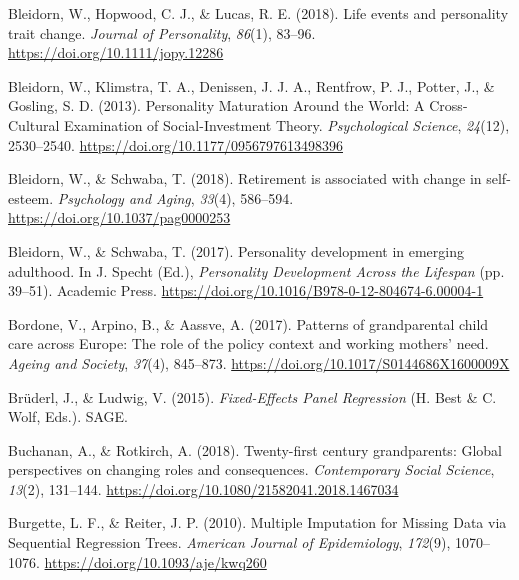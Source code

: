 \documentclass[
  english,
  man, noextraspace]{apa7}
\begin{document}
\leavevmode\hypertarget{ref-bleidornLifeEventsPersonality2018}{}%
Bleidorn, W., Hopwood, C. J., \& Lucas, R. E. (2018). Life events and personality trait change. \emph{Journal of Personality}, \emph{86}(1), 83--96. \url{https://doi.org/10.1111/jopy.12286}

\leavevmode\hypertarget{ref-bleidornPersonalityMaturationWorld2013}{}%
Bleidorn, W., Klimstra, T. A., Denissen, J. J. A., Rentfrow, P. J., Potter, J., \& Gosling, S. D. (2013). Personality Maturation Around the World: A Cross-Cultural Examination of Social-Investment Theory. \emph{Psychological Science}, \emph{24}(12), 2530--2540. \url{https://doi.org/10.1177/0956797613498396}

\leavevmode\hypertarget{ref-bleidornRetirementAssociatedChange2018}{}%
Bleidorn, W., \& Schwaba, T. (2018). Retirement is associated with change in self-esteem. \emph{Psychology and Aging}, \emph{33}(4), 586--594. \url{https://doi.org/10.1037/pag0000253}

\leavevmode\hypertarget{ref-bleidornPersonalityDevelopmentEmerging2017}{}%
Bleidorn, W., \& Schwaba, T. (2017). Personality development in emerging adulthood. In J. Specht (Ed.), \emph{Personality Development Across the Lifespan} (pp. 39--51). Academic Press. \url{https://doi.org/10.1016/B978-0-12-804674-6.00004-1}

\leavevmode\hypertarget{ref-bordonePatternsGrandparentalChild2017}{}%
Bordone, V., Arpino, B., \& Aassve, A. (2017). Patterns of grandparental child care across Europe: The role of the policy context and working mothers' need. \emph{Ageing and Society}, \emph{37}(4), 845--873. \url{https://doi.org/10.1017/S0144686X1600009X}

\leavevmode\hypertarget{ref-bruderlFixedEffectsPanelRegression2015}{}%
Brüderl, J., \& Ludwig, V. (2015). \emph{Fixed-Effects Panel Regression} (H. Best \& C. Wolf, Eds.). SAGE.

\leavevmode\hypertarget{ref-buchananTwentyfirstCenturyGrandparents2018}{}%
Buchanan, A., \& Rotkirch, A. (2018). Twenty-first century grandparents: Global perspectives on changing roles and consequences. \emph{Contemporary Social Science}, \emph{13}(2), 131--144. \url{https://doi.org/10.1080/21582041.2018.1467034}

\leavevmode\hypertarget{ref-burgetteMultipleImputationMissing2010}{}%
Burgette, L. F., \& Reiter, J. P. (2010). Multiple Imputation for Missing Data via Sequential Regression Trees. \emph{American Journal of Epidemiology}, \emph{172}(9), 1070--1076. \url{https://doi.org/10.1093/aje/kwq260}
\end{document}
